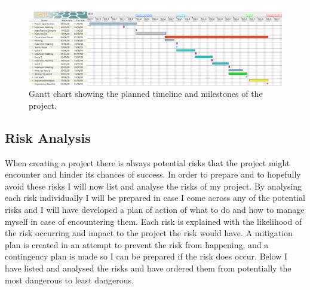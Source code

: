 \documentclass{article}
\begin{document}
\begin{figure}[ht]
    \centering
    \centerline{
        \includegraphics[scale=0.32]{GanttChart.PNG}
    }
    \caption{Gantt chart showing the planned timeline and milestones of the project.}
    \label{fig:Gantt}
\end{figure}


\subsection{Risk Analysis}
When creating a project there is always potential risks that the project might encounter and hinder its chances of success. 
In order to prepare and to hopefully avoid these risks I will now list and analyse the risks of my project. 
By analysing each risk individually I will be prepared in case I come across any of the potential risks and I will have developed a plan of action of what to do and how to manage myself in case of encountering them. 
Each risk is explained with the likelihood of the risk occurring and impact to the project the risk would have.
A mitigation plan is created in an attempt to prevent the risk from happening, and a contingency plan is made so I can be prepared if the risk does occur.
Below I have listed and analysed the risks and have ordered them from potentially the most dangerous to least dangerous. 



\end{document}
